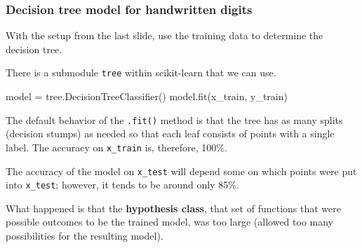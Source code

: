 \documentclass[smaller]{beamer}
\newenvironment{codeblock}
    {\hfill\begin{beamerboxesrounded}[lower=codecol, width=0.8\textwidth]
    \medskip

    }
    { 
    \end{beamerboxesrounded}\hfill
    }
\theoremstyle{example}
\newcommand{\ttt}[1]{{\small\texttt{#1}}}
\begin{document}
\begin{frame}[fragile]
    \frametitle{Decision tree model for handwritten digits}
With the setup from the last slide, use the training data to determine the decision tree.

There is a submodule \ttt{tree} within scikit-learn that we can use.

\begin{codeblock}

\begin{python}
model = tree.DecisionTreeClassifier()
model.fit(x_train, y_train)
\end{python}

\end{codeblock}

The default behavior of the \ttt{.fit()} method is that the tree has as many splits (decision stumps) as needed so that each leaf consists of points with a single label. The accuracy on \lstinline[language=Python,stringstyle=\ttfamily]{x_train} is, therefore, 100\%. 

The accuracy of the model on \lstinline[language=Python,basicstyle=\ttfamily]{x_test} will depend some on which points were put into \lstinline[language=Python,basicstyle=\ttfamily]{x_test}; however, it tends to be around only 85\%.

What happened is that the \textbf{hypothesis class}, that set of functions that were possible outcomes to be the trained model, was too large (allowed too many possibilities for the resulting model). 
\end{frame}
\end{document}
